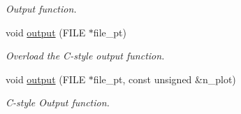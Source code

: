 \begin{DoxyCompactItemize}
\begin{DoxyCompactList}\small\item\em Output function. \end{DoxyCompactList}\item 
void \hyperlink{classoomph_1_1FluidInterfaceElement_ad39bb9862c7f76e07d5ac006a1209cf9}{output} (F\+I\+LE $\ast$file\+\_\+pt)
\begin{DoxyCompactList}\small\item\em Overload the C-\/style output function. \end{DoxyCompactList}\item 
void \hyperlink{classoomph_1_1FluidInterfaceElement_a57efd66ae07fab9e0cf98ac5f8eeb000}{output} (F\+I\+LE $\ast$file\+\_\+pt, const unsigned \&n\+\_\+plot)
\begin{DoxyCompactList}\small\item\em C-\/style Output function. \end{DoxyCompactList}\end{DoxyCompactItemize}
